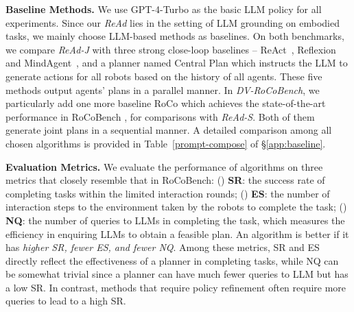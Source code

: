 \documentclass[11pt]{article}
\theoremstyle{plain}
\theoremstyle{remark}
\begin{document}
\textbf{Baseline Methods.} We use GPT-4-Turbo \citep{openAI2023GPT} as the basic LLM policy for all experiments. Since our \emph{ReAd} lies in the setting of LLM grounding on embodied tasks, we mainly choose LLM-based methods as baselines.
On both benchmarks, we compare \emph{ReAd-J} with three strong close-loop baselines -- ReAct~\citep{yao2023react}, Reflexion~\citep{shinn2023reflexion} and MindAgent~\citep{gong2023mindagent}, and a planner named Central Plan which instructs the LLM to generate actions for all robots based on the history of all agents. These five methods output agents' plans in a parallel manner.
In \emph{DV-RoCoBench}, we particularly add one more baseline RoCo \citep{mandi2023roco} which achieves the state-of-the-art performance in RoCoBench \citep{mandi2023roco}, for comparisons with \emph{ReAd-S}. Both of them generate joint plans in a sequential manner.
A detailed comparison among all chosen algorithms is provided in Table~\ref{prompt-compose} of \S\ref{app:baseline}.


\textbf{Evaluation Metrics.} We evaluate the performance of algorithms on three metrics that closely resemble that in RoCoBench: () \textbf{SR}: the success rate of completing tasks within the limited interaction rounds; () \textbf{ES}: the number of interaction steps to the environment taken by the robots to complete the task; () \textbf{NQ}: the number of queries to LLMs in completing the task, which measures the efficiency in enquiring LLMs to obtain a feasible plan. An algorithm is better if it has \emph{higher SR, fewer ES, and fewer NQ}. Among these metrics, SR and ES directly reflect the effectiveness of a planner in completing tasks, while NQ can be somewhat trivial since a planner can have much fewer queries to LLM but has a low SR. In contrast, methods that require policy refinement often require more queries to lead to a high SR.
\end{document}

